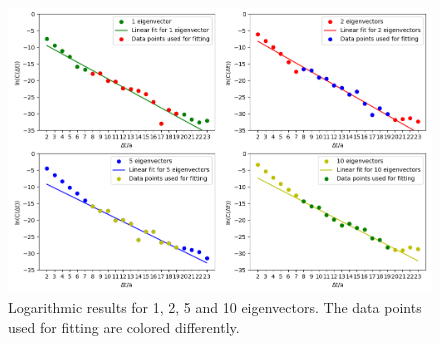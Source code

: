    \begin{figure}[H]
        \centering
        \includegraphics[width=1\textwidth]{images/1_2_5_10_evs_side.png}
        \caption{Logarithmic results for 1, 2, 5 and 10 eigenvectors. The data points used for fitting are colored differently.}
        \label{1_2_5_10_evs_log_separate}
    \end{figure}